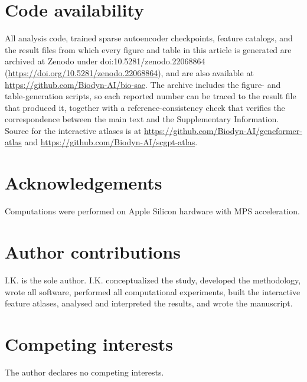 \documentclass[onecolumn,11pt]{article}
\begin{document}
\section*{Code availability}
All analysis code, trained sparse autoencoder checkpoints, feature catalogs, and the result files
from which every figure and table in this article is generated are archived at Zenodo under
doi:10.5281/zenodo.22068864 (\url{https://doi.org/10.5281/zenodo.22068864}), and are also
available at
\url{https://github.com/Biodyn-AI/bio-sae}. The archive includes the figure- and
table-generation scripts, so each reported number can be traced to the result file that produced
it, together with a reference-consistency check that verifies the correspondence between the main
text and the Supplementary Information. Source for the interactive atlases is at
\url{https://github.com/Biodyn-AI/geneformer-atlas} and
\url{https://github.com/Biodyn-AI/scgpt-atlas}.

\section*{Acknowledgements}
Computations were performed on Apple Silicon hardware with MPS acceleration.

\section*{Author contributions}
I.K. is the sole author. I.K. conceptualized the study, developed the methodology, wrote all
software, performed all computational experiments, built the interactive feature atlases,
analysed and interpreted the results, and wrote the manuscript.

\section*{Competing interests}
The author declares no competing interests.


\end{document}
